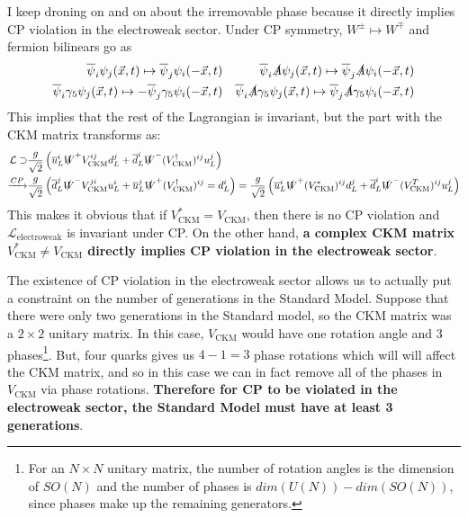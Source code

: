 \documentclass[11pt, oneside]{article}   	%
\theoremstyle{definition}
\numberwithin{equation}{subsection}		%
\begin{document}
I keep droning on and on about the irremovable phase because it directly implies CP violation in the electroweak sector. Under CP 
symmetry, $W^\pm\mapsto W^\mp$ and fermion bilinears go as 
\begin{align}
	\overline \psi_i\psi_j(\vec x, t)\mapsto \overline\psi_j\psi_i (-\vec x, t) && \overline\psi_i \slashed A \psi_j(\vec x, t)\mapsto 
	\overline\psi_j\slashed A\psi_i (-\vec x, t) \\
	\overline \psi_i\gamma_5 \psi_j(\vec x, t)\mapsto - \overline\psi_j\gamma_5\psi_i (-\vec x, t) && 
	\overline\psi_i \slashed A \gamma_5 \psi_j(\vec x, t)\mapsto \overline\psi_j\slashed A \gamma_5 \psi_i (-\vec x, t)
\end{align}
This implies that the rest of the Lagrangian is invariant, but the part with the CKM matrix 
transforms as:
\begin{align}
	\mathcal L\supset &\frac{g}{\sqrt 2} \left( \overline u_L^i \slashed W^+ V_\mathrm{CKM}^{ij} d_L^j + \overline d_L^i \slashed W^- 
	(V_\mathrm{CKM}^\dagger)^{ij} u_L^j \right) \\
	\xrightarrow{CP} &\frac{g}{\sqrt 2} \left(\overline d_L^j \slashed W^- 
	V_\mathrm{CKM}^{ji} u_L^i  +  \overline u_L^j \slashed W^+ (V_\mathrm{CKM}^\dagger)^{ij}  = d_L^i \right)
	= \frac{g}{\sqrt 2} \left( \overline u_L^i \slashed W^+ (V_\mathrm{CKM}^*)^{ij} d_L^j + \overline d_L^i \slashed W^- 
	(V_\mathrm{CKM}^T)^{ij} u_L^j \right)\nonumber
\end{align}
This makes it obvious that if $V_\mathrm{CKM}^* = V_\mathrm{CKM}$, then there is no CP violation and 
$\mathcal L_\mathrm{electroweak}$ is invariant under CP. On the other hand, \textbf{a complex CKM matrix $V_\mathrm{CKM}^*\neq 
V_\mathrm{CKM}$ directly implies CP violation in the electroweak sector}. 

The existence of CP violation in the electroweak sector allows us to actually put a constraint on the number of generations in the 
Standard Model. Suppose that there were only two generations in the Standard model, so the CKM matrix was a $2\times 2$ unitary matrix. 
In this case, $V_\mathrm{CKM}$ would have one rotation angle and 3 phases\footnote{For an $N\times N$ unitary matrix, the number of 
rotation angles is the dimension of $SO(N)$ and the number of phases is $dim(U(N)) - dim(SO(N))$, since phases make up the remaining 
generators.}. But, four quarks gives us $4 - 1 = 3$ phase rotations which will will affect the CKM matrix, and so in this case we can in fact 
remove all of the phases in $V_\mathrm{CKM}$ via phase rotations. \textbf{Therefore for CP to be violated in the electroweak sector, the 
Standard Model must have at least 3 generations}.
\end{document}
